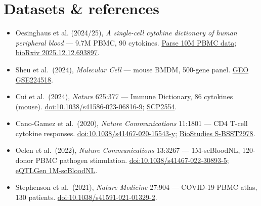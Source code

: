 \documentclass[11pt]{article}
\begin{document}
\section*{Datasets \& references}
\begin{itemize}
\item Oesinghaus et al. (2024/25), \emph{A single-cell cytokine dictionary of human peripheral blood} --- 9.7M PBMC, 90 cytokines. \href{https://www.parsebiosciences.com/datasets/10-million-human-pbmcs-in-a-single-experiment/}{Parse 10M PBMC data}; \href{https://www.biorxiv.org/content/10.64898/2025.12.12.693897v1}{bioRxiv 2025.12.12.693897}.
\item Sheu et al.\ (2024), \emph{Molecular Cell} --- mouse BMDM, 500-gene panel. \href{https://www.ncbi.nlm.nih.gov/geo/query/acc.cgi?acc=GSE224518}{GEO GSE224518}.
\item Cui et al.\ (2024), \emph{Nature} 625:377 --- Immune Dictionary, 86 cytokines (mouse). \href{https://doi.org/10.1038/s41586-023-06816-9}{doi:10.1038/s41586-023-06816-9}; \href{https://singlecell.broadinstitute.org/single_cell/study/SCP2554}{SCP2554}.
\item Cano-Gamez et al.\ (2020), \emph{Nature Communications} 11:1801 --- CD4 T-cell cytokine responses. \href{https://doi.org/10.1038/s41467-020-15543-y}{doi:10.1038/s41467-020-15543-y}; \href{https://www.ebi.ac.uk/biostudies/studies/S-BSST2978}{BioStudies S-BSST2978}.
\item Oelen et al.\ (2022), \emph{Nature Communications} 13:3267 --- 1M-scBloodNL, 120-donor PBMC pathogen stimulation. \href{https://doi.org/10.1038/s41467-022-30893-5}{doi:10.1038/s41467-022-30893-5}; \href{https://eqtlgen.org/sc/datasets/1m-scbloodnl.html}{eQTLGen 1M-scBloodNL}.
\item Stephenson et al.\ (2021), \emph{Nature Medicine} 27:904 --- COVID-19 PBMC atlas, 130 patients. \href{https://doi.org/10.1038/s41591-021-01329-2}{doi:10.1038/s41591-021-01329-2}.
\end{itemize}
\end{document}
